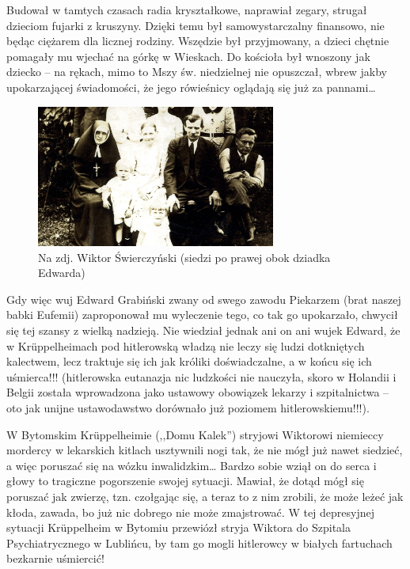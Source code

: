 Budował w tamtych czasach radia kryształkowe, naprawiał zegary, strugał dzieciom fujarki z kruszyny. Dzięki temu był samowystarczalny finansowo, nie będąc ciężarem dla licznej rodziny. Wszędzie był przyjmowany, a dzieci chętnie pomagały mu wjechać na górkę w Wieskach. Do kościoła był wnoszony jak dziecko -- na rękach, mimo to Mszy św. niedzielnej nie opuszczał, wbrew jakby upokarzającej świadomości, że jego rówieśnicy oglądają się już za pannami\ldots

\begin{figure}[!h]
\begin{center}
\includegraphics[width=0.7\textwidth]{photo/wiktor_swierczynski_3.jpg}
\caption[Wiktor Świerczyński z dziadkiem Edwardem]{Na zdj. Wiktor Świerczyński (siedzi po prawej obok dziadka Edwarda)}
\label{rys:wiktor_swierczynski_3}
\end{center}
\end{figure}

Gdy więc wuj Edward Grabiński zwany od swego zawodu Piekarzem (brat naszej babki Eufemii) zaproponował mu wyleczenie tego, co tak go upokarzało, chwycił się tej szansy z wielką nadzieją. Nie wiedział jednak ani on ani wujek Edward, że w Krüppelheimach pod hitlerowską władzą nie leczy się ludzi dotkniętych kalectwem, lecz traktuje się ich jak króliki doświadczalne, a w końcu się ich uśmierca!!! (hitlerowska eutanazja nic ludzkości nie nauczyła, skoro w Holandii i Belgii została wprowadzona jako ustawowy obowiązek lekarzy i szpitalnictwa -- oto jak unijne ustawodawstwo dorównało już poziomem hitlerowskiemu!!!). 

W Bytomskim Krüppelheimie (,,Domu Kalek'') stryjowi Wiktorowi niemieccy mordercy w lekarskich kitlach usztywnili nogi tak, że nie mógł już nawet siedzieć, a więc poruszać się na wózku inwalidzkim… Bardzo sobie wziął on do serca i głowy to tragiczne pogorszenie swojej sytuacji. Mawiał, że dotąd mógł się poruszać jak zwierzę, tzn. czołgając się, a teraz to z nim zrobili, że może leżeć jak kłoda, zawada, bo już nic dobrego nie może zmajstrować. W tej depresyjnej sytuacji Krüppelheim w Bytomiu przewiózł stryja Wiktora do Szpitala Psychiatrycznego w Lublińcu, by tam go mogli hitlerowcy w białych fartuchach bezkarnie uśmiercić!

